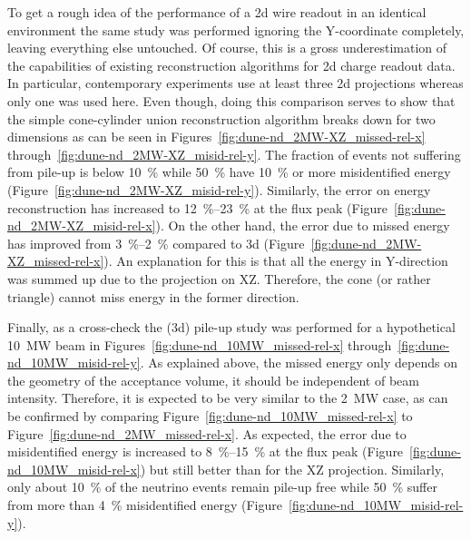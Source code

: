 To get a rough idea of the performance of a \gls{2d} wire readout in an identical environment the same study was performed ignoring the Y-coordinate completely, leaving everything else untouched.
Of course, this is a gross underestimation of the capabilities of existing reconstruction algorithms for \gls{2d} charge readout data.
In particular, contemporary experiments use at least three \gls{2d} projections whereas only one was used here.
Even though, doing this comparison serves to show that the simple cone-cylinder union reconstruction algorithm breaks down for two dimensions as can be seen in Figures~\ref{fig:dune-nd_2MW-XZ_missed-rel-x} through~\ref{fig:dune-nd_2MW-XZ_misid-rel-y}.
The fraction of events not suffering from pile-up is below \SI{10}{\percent} while \SI{50}{\percent} have \SI{10}{\percent} or more misidentified energy (Figure~\ref{fig:dune-nd_2MW-XZ_misid-rel-y}).
Similarly, the error on energy reconstruction has increased to \SIrange{12}{23}{\percent} at the flux peak (Figure~\ref{fig:dune-nd_2MW-XZ_misid-rel-x}).
On the other hand, the error due to missed energy has improved from \SIrange{3}{2}{\percent} compared to \gls{3d} (Figure~\ref{fig:dune-nd_2MW-XZ_missed-rel-x}).
An explanation for this is that all the energy in Y-direction was summed up due to the projection on XZ.
Therefore, the cone (or rather triangle) cannot miss energy in the former direction.

Finally, as a cross-check the (\gls{3d}) pile-up study was performed for a hypothetical \SI{10}{\mega\watt} beam in Figures~\ref{fig:dune-nd_10MW_missed-rel-x} through~\ref{fig:dune-nd_10MW_misid-rel-y}.
As explained above, the missed energy only depends on the geometry of the acceptance volume, it should be independent of beam intensity.
Therefore, it is expected to be very similar to the \SI{2}{\mega\watt} case, as can be confirmed by comparing Figure~\ref{fig:dune-nd_10MW_missed-rel-x} to Figure~\ref{fig:dune-nd_2MW_missed-rel-x}.
As expected, the error due to misidentified energy is increased to \SIrange{8}{15}{\percent} at the flux peak (Figure~\ref{fig:dune-nd_10MW_misid-rel-x}) but still better than for the XZ projection.
Similarly, only about \SI{10}{\percent} of the neutrino events remain pile-up free while \SI{50}{\percent} suffer from more than \SI{4}{\percent} misidentified energy (Figure~\ref{fig:dune-nd_10MW_misid-rel-y}).

